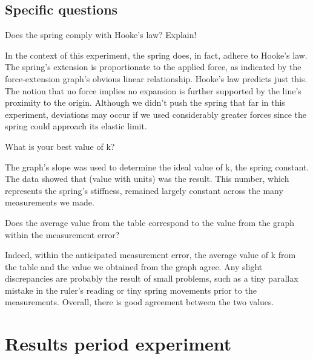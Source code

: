 \documentclass[a4paper, 10pt]{article}
\begin{document}
\begin{justify}
\subsection{Specific questions}
Does the spring comply with Hooke's law? Explain!
\par
In the context of this experiment, the spring does, in fact, adhere to Hooke's law. The spring's extension is proportionate to the applied force, as indicated by the force-extension graph's obvious linear relationship. Hooke's law predicts just this. The notion that no force implies no expansion is further supported by the line's proximity to the origin. Although we didn't push the spring that far in this experiment, deviations may occur if we used considerably greater forces since the spring could approach its elastic limit.
\par
What is your best value of k?
\par
The graph's slope was used to determine the ideal value of k, the spring constant. The data showed that (value with units) was the result. This number, which represents the spring's stiffness, remained largely constant across the many measurements we made.
\par
Does the average value from the table correspond to the value from the graph
within the measurement error?
\par
Indeed, within the anticipated measurement error, the average value of k from the table and the value we obtained from the graph agree. Any slight discrepancies are probably the result of small problems, such as a tiny parallax mistake in the ruler's reading or tiny spring movements prior to the measurements. Overall, there is good agreement between the two values.
\section{Results period experiment}

\end{justify}
\end{document}

